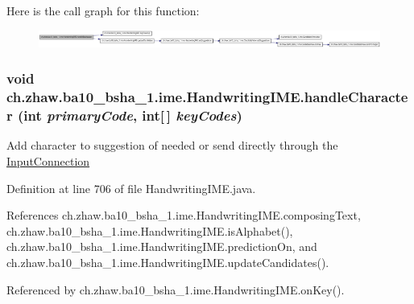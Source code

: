 Here is the call graph for this function:\nopagebreak
\begin{figure}[H]
\begin{center}
\leavevmode
\includegraphics[width=420pt]{classch_1_1zhaw_1_1ba10__bsha__1_1_1ime_1_1HandwritingIME_a629b38e45bc795d46cb7ce1c79bc1def_cgraph}
\end{center}
\end{figure}
\hypertarget{classch_1_1zhaw_1_1ba10__bsha__1_1_1ime_1_1HandwritingIME_a5b7f7f06b8e6f5eb9797725b5d814f5c}{
\subsubsection[{handleCharacter}]{\setlength{\rightskip}{0pt plus 5cm}void ch.zhaw.ba10\_\-bsha\_\-1.ime.HandwritingIME.handleCharacter (int {\em primaryCode}, \/  int\mbox{[}$\,$\mbox{]} {\em keyCodes})}}
\label{classch_1_1zhaw_1_1ba10__bsha__1_1_1ime_1_1HandwritingIME_a5b7f7f06b8e6f5eb9797725b5d814f5c}
Add character to suggestion of needed or send directly through the \hyperlink{}{InputConnection} 

Definition at line 706 of file HandwritingIME.java.

References ch.zhaw.ba10\_\-bsha\_\-1.ime.HandwritingIME.composingText, ch.zhaw.ba10\_\-bsha\_\-1.ime.HandwritingIME.isAlphabet(), ch.zhaw.ba10\_\-bsha\_\-1.ime.HandwritingIME.predictionOn, and ch.zhaw.ba10\_\-bsha\_\-1.ime.HandwritingIME.updateCandidates().

Referenced by ch.zhaw.ba10\_\-bsha\_\-1.ime.HandwritingIME.onKey().

